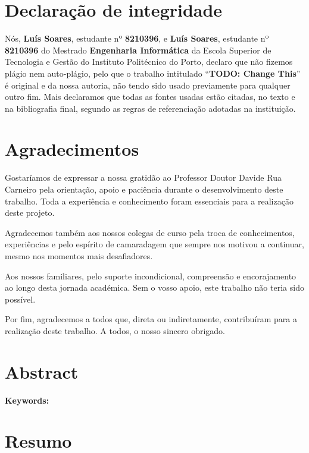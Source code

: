 \documentclass[11pt,a4paper]{report}
\begin{document}



\chapter*{Declaração de integridade}

Nós, \textbf{Luís Soares}, estudante nº \textbf{8210396}, e \textbf{Luís Soares}, estudante nº \textbf{8210396} do Mestrado \textbf{Engenharia Informática} da Escola Superior de Tecnologia e Gestão do Instituto Politécnico do Porto, declaro que não fizemos plágio nem auto-plágio, pelo que o trabalho intitulado “\textbf{TODO: Change This}” é original e da nossa autoria, não tendo sido usado previamente para qualquer outro fim. Mais declaramos que todas as fontes usadas estão citadas, no texto e na bibliografia final, segundo as regras de referenciação adotadas na instituição.

\chapter*{Agradecimentos}

Gostaríamos de expressar a nossa gratidão ao Professor Doutor Davide Rua Carneiro pela
orientação, apoio e paciência durante o desenvolvimento deste trabalho.
Toda a experiência e conhecimento foram essenciais para a realização deste projeto.

Agradecemos também aos nossos colegas de curso pela troca de conhecimentos,
experiências e pelo espírito de camaradagem que sempre nos motivou a continuar,
mesmo nos momentos mais desafiadores.

Aos nossos familiares, pelo suporte incondicional, compreensão e encorajamento ao
longo desta jornada académica. Sem o vosso apoio, este trabalho não teria sido possível.

Por fim, agradecemos a todos que, direta ou indiretamente, contribuíram para a
realização deste trabalho. A todos, o nosso sincero obrigado.

\chapter*{Abstract}



\textbf{Keywords:} 

\chapter*{Resumo}
\end{document}
